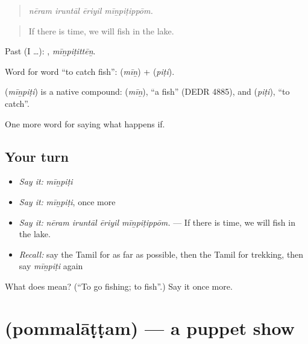 \begin{quote}
\emph{nēram iruntāl ēriyil mīṉpiṭippōm.}
\end{quote}

\begin{quote}
If there is time, we will fish in the lake.
\end{quote}

Past (I …): , \emph{mīṉpiṭittēṉ}.

Word for word \textquotedblleft{}to catch fish\textquotedblright{}:  (\emph{mīṉ}) +  (\emph{piṭi}).

\begin{cousinweb}
\textbf{} (\emph{mīṉpiṭi}) is a native compound:  (\emph{mīṉ}), \textquotedblleft{}a fish\textquotedblright{} (DEDR 4885), and  (\emph{piṭi}), \textquotedblleft{}to catch\textquotedblright{}.
\end{cousinweb}

\begin{grammarlens}[title={What you've built}]
One more word for saying what happens if.
\end{grammarlens}

\subsection*{Your turn}
\begin{itemize}
\raggedright
  \item \emph{Say it:} \emph{mīṉpiṭi}
  \item \emph{Say it:} \emph{mīṉpiṭi}, once more
  \item \emph{Say it:} \emph{nēram iruntāl ēriyil mīṉpiṭippōm.} — If there is time, we will fish in the lake.
  \item \emph{Recall:} say the Tamil for as far as possible, then the Tamil for trekking, then say \emph{mīṉpiṭi} again
\end{itemize}

\begin{tcolorbox}[breakable,colback=teal!4,colframe=teal!35!black,title={Before you move on}]
What does  mean? (\textquotedblleft{}To go fishing; to fish\textquotedblright{}.) Say it once more.
\end{tcolorbox}
\section[\texorpdfstring{\ta{பொம்மலாட்டம்} (pommalāṭṭam)}{பொம்மலாட்டம் (pommalāṭṭam)}]{ (pommalāṭṭam) — a puppet show}

